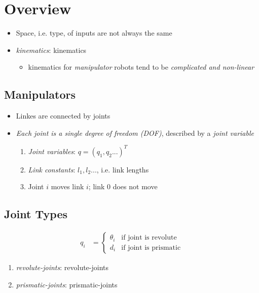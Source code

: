 \chapter{Overview}

\begin{itemize}
  \item Space, i.e. type, of inputs are not always the same
  \item \emph{\Gls{kinematics}}: \glsdesc{kinematics}
  \begin{itemize}
    \item \Gls{kinematics} for \emph{manipulator} robots tend to be
    \emph{complicated and non-linear}
  \end{itemize}
\end{itemize}

\section{Manipulators}

  \begin{itemize}
    \item Linkes are connected by joints
    \item \emph{Each joint is a single degree of freedom (DOF)}, described by a
    \emph{joint variable}
    \begin{enumerate}
      \item \emph{Joint variables}: $ q = \left( q_{1}, q_{2} ... \right)^{T} $
      \item \emph{Link constants}: $ l_{1}, l_{2} ... $, i.e. link lengths
      \item Joint $ i $ moves link $ i $; link $ 0 $ does not move
    \end{enumerate}
  \end{itemize}

\section{Joint Types}

  \begin{align}
    q_{i} &=
    \begin{cases}
      \theta_{i} & \text{if joint is revolute} \\
      d_{i} & \text{if joint is prismatic}
    \end{cases}
  \end{align}

  \begin{enumerate}
    \item \emph{\Gls{revolute-joints}}: \glsdesc{revolute-joints}
    \item \emph{\Gls{prismatic-joints}}: \glsdesc{prismatic-joints}
  \end{enumerate}

